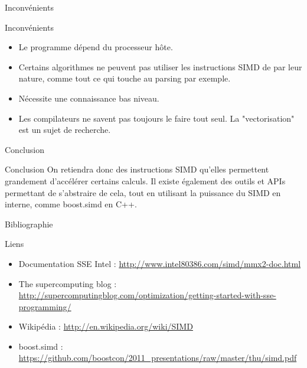 \documentclass{beamer}
\begin{document}
\begin{frame}{Inconvénients}
    \begin{block}{Inconvénients}
        \begin{itemize}
        \item Le programme dépend du processeur hôte.
        \item Certains algorithmes ne peuvent pas utiliser les instructions SIMD de
        par leur nature, comme tout ce qui touche au parsing par exemple.
        \item Nécessite une connaissance bas niveau.
        \item Les compilateurs ne savent pas toujours le faire tout seul. La 
        "vectorisation" est un sujet de recherche.
        \end{itemize}
    \end{block}
\end{frame}


\begin{frame}{Conclusion}
    \begin{block}{Conclusion}
    On retiendra donc des instructions SIMD qu'elles permettent grandement 
    d'accélérer certains calculs.
\newline \newline
    Il existe également des outils et APIs permettant de s'abstraire de cela, 
    tout en utilisant la puissance du SIMD en interne, comme boost.simd en C++.
    \end{block}
\end{frame}


\begin{frame}{Bibliographie}
    \begin{block}{Liens}
        \begin{itemize}
        \item Documentation SSE Intel : \url{http://www.intel80386.com/simd/mmx2-doc.html}
        \item The supercomputing blog : \url{http://supercomputingblog.com/optimization/getting-started-with-sse-programming/}
        \item Wikipédia : \url{http://en.wikipedia.org/wiki/SIMD}
		\item boost.simd : \url{https://github.com/boostcon/2011_presentations/raw/master/thu/simd.pdf}
        \end{itemize}
    \end{block}
\end{frame}
\end{document}
